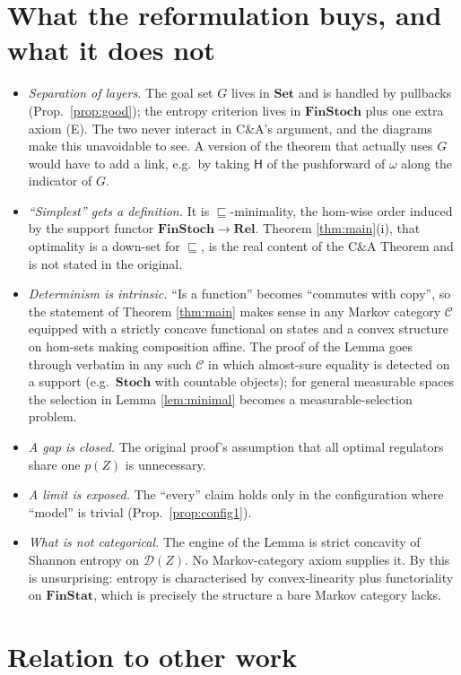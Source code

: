 \documentclass[11pt,a4paper]{article}
\theoremstyle{definition}
\theoremstyle{remark}
\newcommand{\Set}{\mathbf{Set}}
\newcommand{\Rel}{\mathbf{Rel}}
\newcommand{\FinStoch}{\mathbf{FinStoch}}
\newcommand{\Stoch}{\mathbf{Stoch}}
\newcommand{\cC}{\mathcal{C}}
\newcommand{\Dist}{\mathcal{D}}
\newcommand{\ent}{\mathsf{H}}
\newcommand{\refines}{\sqsubseteq}
\begin{document}
\section{What the reformulation buys, and what it does not}

\begin{itemize}
\item \emph{Separation of layers.} The goal set $G$ lives in $\Set$ and is handled by pullbacks (Prop.\ \ref{prop:good}); the entropy criterion lives in $\FinStoch$ plus one extra axiom (E). The two never interact in C\&A's argument, and the diagrams make this unavoidable to see. A version of the theorem that actually uses $G$ would have to add a link, e.g.\ by taking $\ent$ of the pushforward of $\omega$ along the indicator of $G$.
\item \emph{``Simplest'' gets a definition.} It is $\refines$-minimality, the hom-wise order induced by the support functor $\FinStoch\to\Rel$. Theorem \ref{thm:main}(i), that optimality is a down-set for $\refines$, is the real content of the C\&A Theorem and is not stated in the original.
\item \emph{Determinism is intrinsic.} ``Is a function'' becomes ``commutes with $\mathrm{copy}$'', so the statement of Theorem \ref{thm:main} makes sense in any Markov category $\cC$ equipped with a strictly concave functional on states and a convex structure on hom-sets making composition affine. The proof of the Lemma goes through verbatim in any such $\cC$ in which almost-sure equality is detected on a support (e.g.\ $\Stoch$ with countable objects); for general measurable spaces the selection in Lemma \ref{lem:minimal} becomes a measurable-selection problem.
\item \emph{A gap is closed.} The original proof's assumption that all optimal regulators share one $p(Z)$ is unnecessary.
\item \emph{A limit is exposed.} The ``every'' claim holds only in the configuration where ``model'' is trivial (Prop.\ \ref{prop:config1}).
\item \emph{What is not categorical.} The engine of the Lemma is strict concavity of Shannon entropy on $\Dist(Z)$. No Markov-category axiom supplies it. By \cite{BFL2011} this is unsurprising: entropy is characterised by convex-linearity plus functoriality on $\mathbf{FinStat}$, which is precisely the structure a bare Markov category lacks.
\end{itemize}

\section{Relation to other work}
\end{document}
